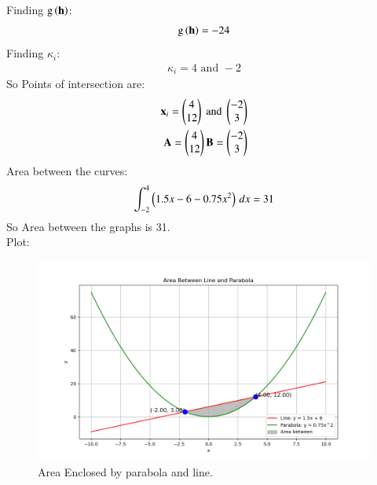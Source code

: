 \documentclass[journal]{IEEEtran}
\numberwithin{equation}{enumi}
\numberwithin{figure}{enumi}
\begin{document}
Finding $\text{g}\left(\mathbf{h}\right)$:
\begin{align}
	\text{g}\left(\mathbf{h}\right)=-24
\end{align}
Finding $\kappa_i$:
\begin{align}
	\kappa_i=4 \text{ and } -2
\end{align}
So Points of intersection are:
\begin{align}
	\mathbf{x}_i=\begin{pmatrix}4\\12\end{pmatrix} \text{ and } \begin{pmatrix}-2\\3\end{pmatrix}\\
 \mathbf{A}=\begin{pmatrix}4\\12\end{pmatrix} \mathbf{B}=\begin{pmatrix}-2\\3\end{pmatrix}
\end{align}
Area between the curves:
\begin{align}
     \int_{-2}^{4}\left(1.5x-6-0.75x^2\right)\,dx =31
\end{align}
So Area between the graphs is 31.\\



Plot:
\begin{figure}[h!]
   \centering
   \includegraphics[width=0.9\linewidth]{Figure_1.png}
	\caption{Area Enclosed by parabola and line. }
   \label{stemplot}
\end{figure}
\end{document}
